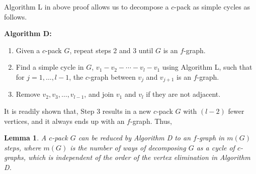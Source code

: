 \documentclass[notitlepage,preprint]{revtex4-1}
\newtheorem{lemm}[thrm]{Lemma}
\begin{document}
Algorithm L in above proof allows us to
  decompose a $c$-pack as simple cycles as follows.

\textbf{Algorithm D:}
\begin{enumerate}
  \item
    Given a $c$-pack $G$,
      repeat steps 2 and 3 until $G$ is an $f$-graph.
  \item
    Find a simple cycle in $G$,
      $v_1 - v_2 - \cdots - v_l - v_1$
      using Algorithm L,
      such that
      for $j = 1, \dots, l-1$,
      the $c$-graph between $v_j$ and $v_{j+1}$
      is an $f$-graph.
  \item
    Remove $v_2, v_3, \dots, v_{l-1}$,
      and join $v_1$ and $v_l$ if they are not adjacent.
\end{enumerate}
%
It is readily shown that,
  Step 3 results in a new $c$-pack $G$
  with $(l - 2)$ fewer vertices,
  and it always ends up with an $f$-graph.
%
Thus,


\begin{lemm}
  A $c$-pack $G$ can be reduced
    by Algorithm D to an $f$-graph in $m(G)$ steps,
    where $m(G)$ is the number of ways of decomposing
    $G$ as a cycle of $c$-graphs,
    which is independent of the order of the vertex elimination
    in Algorithm D.
\label{thm:hncdecomp}
\end{lemm}
\end{document}
